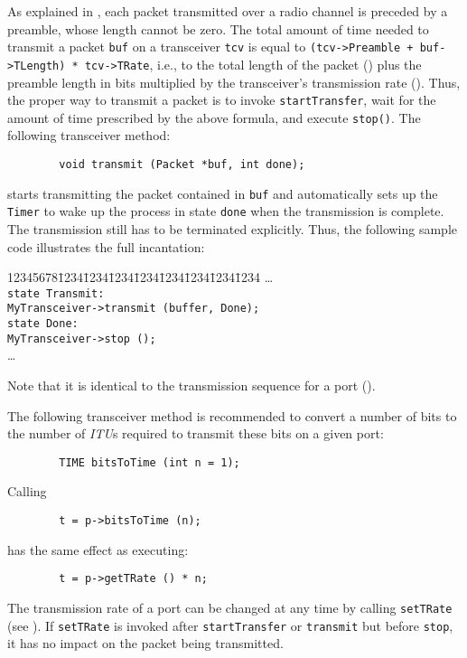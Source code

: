 As explained in , each packet transmitted over a
radio channel is preceded by a preamble, whose length cannot be zero.
The total amount of time needed to transmit a packet {\tt buf} on a
transceiver {\tt tcv} is equal to
{\tt (tcv->Preamble + buf->TLength) * tcv->TRate},
i.e., to the total length of the packet () plus the
preamble length in bits multiplied by the
transceiver's transmission rate ().
Thus, the proper way to transmit a packet is to invoke
{\tt startTransfer}, wait for
the amount of time prescribed by the above formula, and
execute {\tt stop()}.
The following transceiver method:
\begin{verbatim}
        void transmit (Packet *buf, int done);
\end{verbatim}
starts transmitting the packet contained in {\tt buf} and automatically
sets up the {\tt Timer} to wake up the process in state {\tt done} when the
transmission is complete.
The transmission still has to be terminated explicitly.
Thus, the following sample code illustrates the full incantation:
{\tt\begin{tabbing}
12345678\=1234\=1234\=1234\=1234\=1234\=1234\=1234\=1234\kill
\> \ldots \\
\> {\tt state Transmit:}\\
\> \> {\tt MyTransceiver->transmit (buffer, Done);}\\
\> {\tt state Done:}\\
\> \> {\tt MyTransceiver->stop ();}\\
\> \>\ldots
\end{tabbing}}
\noindent
Note that it is identical to the transmission sequence for a port
().

The following transceiver method is recommended
to convert a number of bits to the number of {\em ITU\/}s
required to transmit these bits on a given port:
\begin{verbatim}
        TIME bitsToTime (int n = 1);
\end{verbatim}
Calling
\begin{verbatim}
        t = p->bitsToTime (n);
\end{verbatim}
has the same effect as executing:
\begin{verbatim}
        t = p->getTRate () * n;
\end{verbatim}

\medskip

The transmission rate of a port can be changed at any time by calling
{\tt setTRate} (see ).
If {\tt setTRate} is invoked after {\tt startTransfer} or {\tt transmit} but
before {\tt stop}, it has no impact on the packet being transmitted.

